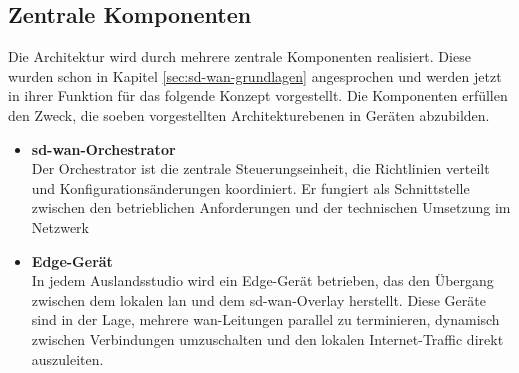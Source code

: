 \subsection*{Zentrale Komponenten}
Die Architektur wird durch mehrere zentrale Komponenten realisiert. Diese wurden schon in Kapitel \ref{sec:sd-wan-grundlagen} angesprochen und werden jetzt in ihrer Funktion für das folgende Konzept vorgestellt. Die Komponenten erfüllen den Zweck, die soeben vorgestellten Architekturebenen in Geräten abzubilden.

\begin{itemize}
	\item \textbf{\ac{sd-wan}-Orchestrator} \\
	Der Orchestrator ist die zentrale Steuerungseinheit, die Richtlinien verteilt und Konfigurationsänderungen koordiniert. Er fungiert als Schnittstelle zwischen den betrieblichen Anforderungen und der technischen Umsetzung im Netzwerk
	\item \textbf{Edge-Gerät} \\
	In jedem Auslandsstudio wird ein Edge-Gerät betrieben, das den Übergang zwischen dem lokalen \ac{lan} und dem \ac{sd-wan}-Overlay herstellt. Diese Geräte sind in der Lage, mehrere \ac{wan}-Leitungen parallel zu terminieren, dynamisch zwischen Verbindungen umzuschalten und den lokalen Internet-Traffic direkt auszuleiten.
\end{itemize}